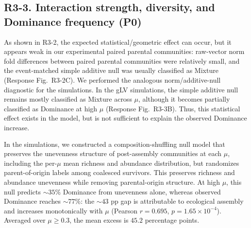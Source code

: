 \subsection*{R3-3. Interaction strength, diversity, and Dominance frequency (P0)}


\responselabel
As shown in R3-2, the expected statistical/geometric effect can occur, but it appears weak in our experimental paired parental communities: raw-vector norm fold differences between paired parental communities were relatively small, and the event-matched simple additive null was usually classified as Mixture (Response Fig.~R3-2C). We performed the analogous norm/additive-null diagnostic for the simulations. In the gLV simulations, the simple additive null remains mostly classified as Mixture across $\mu$, although it becomes partially classified as Dominance at high $\mu$ (Response Fig.~R3-3B). Thus, this statistical effect exists in the model, but is not sufficient to explain the observed Dominance increase.

In the simulations, we constructed a composition-shuffling null model that preserves the unevenness structure of post-assembly communities at each $\mu$, including the per-$\mu$ mean richness and abundance distribution, but randomizes parent-of-origin labels among coalesced survivors. This preserves richness and abundance unevenness while removing parental-origin structure. At high $\mu$, this null predicts $\sim 35\%$ Dominance from unevenness alone, whereas observed Dominance reaches $\sim 77\%$: the $\sim 43$ pp gap is attributable to ecological assembly and increases monotonically with $\mu$ (Pearson $r = 0.695$, $p = 1.65 \times 10^{-4}$). Averaged over $\mu \geq 0.3$, the mean excess is $45.2$ percentage points.

